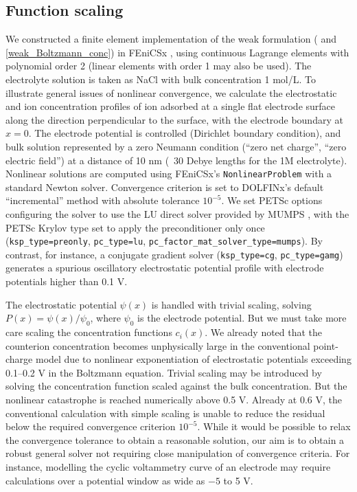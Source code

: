 \subsection{Function scaling}
We constructed a finite element implementation of the weak
formulation ( and \eqref{weak_Boltzmann_conc}) in
FEniCSx \citep{baratta2023dolfinx}, using continuous
Lagrange elements with polynomial order 2 (linear elements with order
1 may also be used).  The electrolyte solution
is taken as NaCl with bulk concentration 1 mol/L.  To illustrate
general issues of nonlinear convergence, we calculate the
electrostatic and ion concentration profiles of ion adsorbed at a
single flat electrode surface along the direction perpendicular to the
surface, with the electrode boundary at $x=0$.  The electrode
potential is controlled (Dirichlet boundary condition), and bulk
solution represented by a zero Neumann condition (``zero net charge'', ``zero electric
field'') at  a distance of 10 nm (~30 Debye lengths for the 1M
electrolyte). Nonlinear solutions are computed using FEniCSx's
\texttt{NonlinearProblem} with a standard Newton solver. Convergence criterion
is set to DOLFINx's default ``incremental'' method with absolute
tolerance $10^{-5}$.
We set PETSc options \citep{PETSc_manual,petsc4py_2011} configuring the solver to use the LU direct
solver provided by MUMPS \citep{MUMPS_2001,MUMPS_2019}, with the PETSc Krylov type set to apply the
preconditioner only once (\verb|ksp_type=preonly|, \verb|pc_type=lu|,  \verb|pc_factor_mat_solver_type=mumps|).
By contrast, for instance, a
conjugate gradient solver (\verb|ksp_type=cg|, \verb|pc_type=gamg|)
generates a spurious oscillatory electrostatic potential profile with electrode
potentials higher than 0.1 V.

The electrostatic potential $\psi(x)$ is handled with trivial
scaling, solving $P(x)=\psi(x)/\psi_0$, where $\psi_0$ is the
electrode potential.
But we must take more care scaling the concentration functions
$c_i(x)$.
We already noted that the counterion concentration becomes unphysically
large in the conventional point-charge model due to nonlinear
exponentiation of  electrostatic potentials exceeding 0.1--0.2 V in
the Boltzmann equation. Trivial scaling may be introduced by solving
the concentration function scaled against the bulk concentration. But
 the nonlinear catastrophe is reached
numerically above 0.5 V. Already at 0.6 V, the conventional
calculation with simple scaling is unable to reduce the residual below
the required convergence criterion  $10^{-5}$. While it would be possible to relax the
convergence tolerance to obtain a reasonable solution, our aim is to
obtain a robust general solver not requiring close manipulation of
convergence criteria. For instance,  modelling the
cyclic voltammetry curve of an electrode may require calculations
over a potential window as wide as $-5$ to 5 V.

